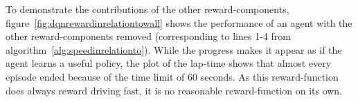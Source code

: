 To demonstrate the contributions of the other reward-components, figure~\ref{fig:dqnrewardinrelationtowall} shows the performance of an agent with the other reward-components removed (corresponding to lines 1-4 from algorithm~\ref{alg:speedinrelationto}). While the progress makes it appear as if the agent learns a useful policy, the plot of the lap-time shows that almost every episode ended because of the time limit of 60 seconds. As this reward-function does always reward driving fast, it is no reasonable reward-function on its own.